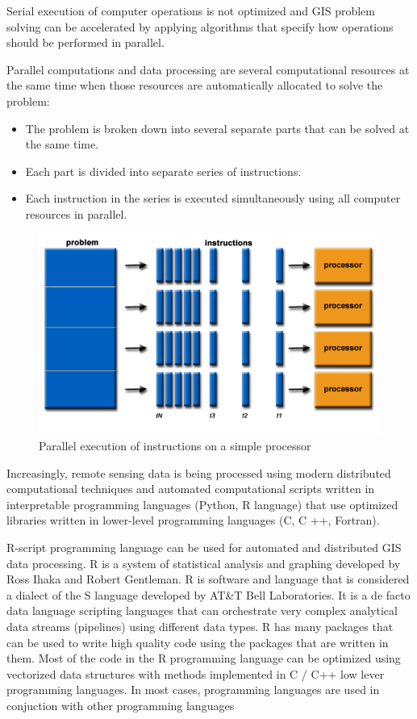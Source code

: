 {{	Serial execution of computer operations is not optimized and GIS problem solving can be accelerated by applying algorithms that specify how operations should be performed in parallel.
	
	Parallel computations and data processing are several computational resources at the same time when those resources are automatically allocated to solve the problem:
	
	\begin{itemize}
		\item The problem is broken down into several separate parts that can be solved at the same time.
		\item Each part is divided into separate series of instructions.
		\item Each instruction in the series is executed simultaneously using all computer resources in parallel.
	\end{itemize}

	\begin{figure}[H]
		\centering
		\includegraphics[width=0.9\linewidth]{images/par_exec.png}
		\caption{Parallel execution of instructions on a simple processor}
		\label{fig:par_exec}
	\end{figure}

	Increasingly, remote sensing data is being processed using modern distributed computational techniques and automated computational scripts written in interpretable programming languages (Python, R language) that use optimized libraries written in lower-level programming languages (C, C ++, Fortran).
	
	R-script programming language can be used for automated and distributed GIS data processing. R is a system of statistical analysis and graphing developed by Ross Ihaka and Robert Gentleman. R is software and language that is considered a dialect of the S language developed by AT\&T Bell Laboratories. It is a de facto data language scripting languages that can orchestrate very complex analytical data streams (pipelines) using different data types. R has many packages that can be used to write high quality code using the packages that are written in them. Most of the code in the R programming language can be optimized using vectorized data structures with methods implemented in C / C++ low lever programming languages. In most cases, programming languages are used in conjuction with other programming languages
 	
}}
